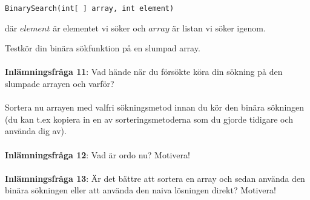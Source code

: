 \documentclass{article}
\begin{document}
\begin{lstlisting}
BinarySearch(int[ ] array, int element)
\end{lstlisting}

där $element$ är elementet vi söker och $array$ är listan vi söker igenom.

Testkör din binära sökfunktion på en slumpad array. 
\\\\

\textbf{Inlämningsfråga 11}: Vad hände när du försökte köra din sökning på den slumpade arrayen och varför?\\\\
Sortera nu arrayen med valfri sökningsmetod innan du kör den binära sökningen (du kan t.ex kopiera in en av sorteringsmetoderna som du gjorde tidigare och använda dig av). \\\\
\textbf{Inlämningsfråga 12}: Vad är ordo nu? Motivera! \\\\
\textbf{Inlämningsfråga 13}: Är det bättre att sortera en array och sedan använda den binära sökningen eller att använda den naiva lösningen direkt? Motivera!
\end{document}
